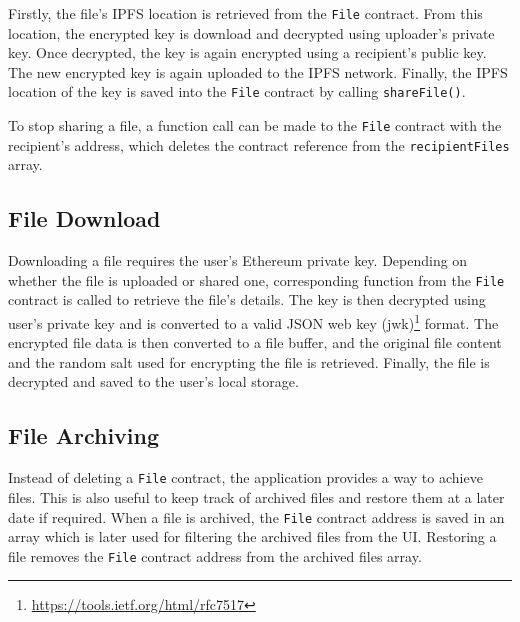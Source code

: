 Firstly, the file's IPFS location is retrieved from the \texttt{File} contract. From this location, the encrypted key is download and decrypted using uploader's private key. Once decrypted, the key is again encrypted using a recipient's public key. The new encrypted key is again uploaded to the IPFS network. Finally, the IPFS location of the key is saved into the \texttt{File} contract by calling \texttt{shareFile()}.

To stop sharing a file, a function call can be made to the \texttt{File} contract with the recipient's address, which deletes the contract reference from the \texttt{recipientFiles} array.

\subsection{File Download}
Downloading a file requires the user's Ethereum private key. Depending on whether the file is uploaded or shared one, corresponding function from the \texttt{File} contract is called to retrieve the file's details. The key is then decrypted using user's private key and is converted to a valid JSON web key (jwk)\footnote{\url{https://tools.ietf.org/html/rfc7517}} format. The encrypted file data is then converted to a file buffer, and the original file content and the random salt used for encrypting the file is retrieved. Finally, the file is decrypted and saved to the user's local storage.

\subsection{File Archiving}
Instead of deleting a \texttt{File} contract, the application provides a way to achieve files. This is also useful to keep track of archived files and restore them at a later date if required. When a file is archived, the \texttt{File} contract address is saved in an array which is later used for filtering the archived files from the UI. Restoring a file removes the \texttt{File} contract address from the archived files array.